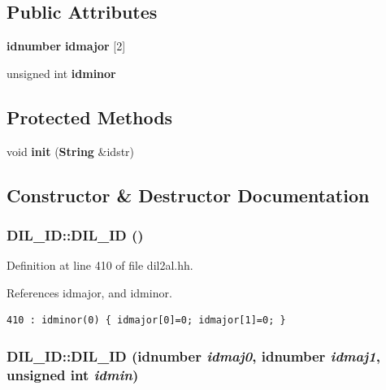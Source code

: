 \subsection*{Public Attributes}
\begin{CompactItemize}
\item 
{\bf idnumber} {\bf idmajor} [2]
\item 
unsigned int {\bf idminor}
\end{CompactItemize}
\subsection*{Protected Methods}
\begin{CompactItemize}
\item 
void {\bf init} ({\bf String} \&idstr)
\end{CompactItemize}


\subsection{Constructor \& Destructor Documentation}
\subsubsection{\setlength{\rightskip}{0pt plus 5cm}DIL\_\-ID::DIL\_\-ID ()\hspace{0.3cm}{\tt  [inline]}}\label{classDIL__ID_a0}




Definition at line 410 of file dil2al.hh.

References idmajor, and idminor.



\footnotesize\begin{verbatim}410 : idminor(0) { idmajor[0]=0; idmajor[1]=0; }
\end{verbatim}\normalsize 
{}
\subsubsection{\setlength{\rightskip}{0pt plus 5cm}DIL\_\-ID::DIL\_\-ID ({\bf idnumber} {\em idmaj0}, {\bf idnumber} {\em idmaj1}, unsigned int {\em idmin})\hspace{0.3cm}{\tt  [inline]}}\label{classDIL__ID_a1}




